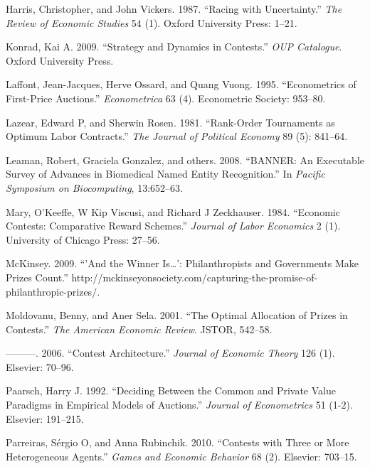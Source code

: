 \documentclass[11pt, titlepage]{article}
\begin{document}
\hypertarget{ref-harris1987racing}{}
Harris, Christopher, and John Vickers. 1987. ``Racing with
Uncertainty.'' \emph{The Review of Economic Studies} 54 (1). Oxford
University Press: 1--21.

\hypertarget{ref-konrad2009strategy}{}
Konrad, Kai A. 2009. ``Strategy and Dynamics in Contests.'' \emph{OUP
Catalogue}. Oxford University Press.

\hypertarget{ref-laffont1995econometrics}{}
Laffont, Jean-Jacques, Herve Ossard, and Quang Vuong. 1995.
``Econometrics of First-Price Auctions.'' \emph{Econometrica} 63 (4).
Econometric Society: 953--80.

\hypertarget{ref-lazear1981rank}{}
Lazear, Edward P, and Sherwin Rosen. 1981. ``Rank-Order Tournaments as
Optimum Labor Contracts.'' \emph{The Journal of Political Economy} 89
(5): 841--64.

\hypertarget{ref-leaman2008banner}{}
Leaman, Robert, Graciela Gonzalez, and others. 2008. ``BANNER: An
Executable Survey of Advances in Biomedical Named Entity Recognition.''
In \emph{Pacific Symposium on Biocomputing}, 13:652--63.

\hypertarget{ref-mary1984economic}{}
Mary, O'Keeffe, W Kip Viscusi, and Richard J Zeckhauser. 1984.
``Economic Contests: Comparative Reward Schemes.'' \emph{Journal of
Labor Economics} 2 (1). University of Chicago Press: 27--56.

\hypertarget{ref-mckinsey2009}{}
McKinsey. 2009. ``'And the Winner Is\ldots{}': Philanthropists and
Governments Make Prizes Count.''
http://mckinseyonsociety.com/capturing-the-promise-of-philanthropic-prizes/.

\hypertarget{ref-moldovanu2001optimal}{}
Moldovanu, Benny, and Aner Sela. 2001. ``The Optimal Allocation of
Prizes in Contests.'' \emph{The American Economic Review}. JSTOR,
542--58.

\hypertarget{ref-moldovanu2006contest}{}
---------. 2006. ``Contest Architecture.'' \emph{Journal of Economic
Theory} 126 (1). Elsevier: 70--96.

\hypertarget{ref-paarsch1992deciding}{}
Paarsch, Harry J. 1992. ``Deciding Between the Common and Private Value
Paradigms in Empirical Models of Auctions.'' \emph{Journal of
Econometrics} 51 (1-2). Elsevier: 191--215.

\hypertarget{ref-parreiras2010contests}{}
Parreiras, Sérgio O, and Anna Rubinchik. 2010. ``Contests with Three or
More Heterogeneous Agents.'' \emph{Games and Economic Behavior} 68 (2).
Elsevier: 703--15.
\end{document}
